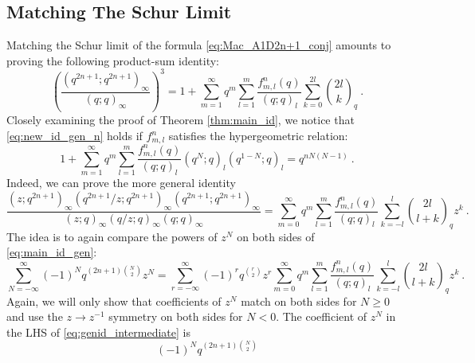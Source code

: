 \documentclass[a4paper,10pt]{article}
\newcommand{\tsf}[1]{\textsf{#1}}
\begin{document}
\subsection{Matching The Schur Limit}\label{sec:schur_gen_n}
Matching the Schur limit of the formula \eqref{eq:Mac_A1D2n+1_conj} amounts to proving the following product-sum identity:
\begin{equation}\label{eq:new_id_gen_n}
   \left(\frac{\left(q^{2n+1} ; q^{2n+1}\right)_{\infty}}{(q ; q)_{\infty}}\right)^3= 1 + \sum_{m=1}^\infty 
    q^m \sum_{l=1}^m
    \frac{f^n_{m,l}(q)}{(q;q)_l}\sum_{k=0}^{2l}\binom{2l}{k}_q~.
\end{equation}
Closely examining the proof of Theorem \ref{thm:main_id}, we notice that \eqref{eq:new_id_gen_n} holds if
$f^n_{m,l}$ satisfies the hypergeometric relation:
\begin{equation}\label{eq:fmnl_def}
    1 + \sum_{m=1}^\infty q^m \sum_{l=1}^m 
    \frac{f^n_{m,l}(q)}{(q;q)_l} (q^N; q)_l 
    (q^{1-N};q)_l = q^{nN(N-1)}~.
\end{equation}
Indeed, we can prove the more general identity 
\begin{equation}\label{eq:main_id_gen}
\frac{\left(z ; q^{2n+1}\right)_{\infty}\left(q^{2n+1} / z ; q^{2n+1}\right)_{\infty}\left(q^{2n+1} ; q^{2n+1}\right)_{\infty}}{(z ; q)_{\infty}(q / z ; q)_{\infty}(q ; q)_{\infty}}=\sum_{m=0}^{\infty}q^m\sum_{l=1}^m \frac{f^n_{m,l}(q)}{(q ; q)_l} \sum_{k=-l}^l{
2 l \choose
l+k}_q z^k~.    
\end{equation}
The idea is to again compare the powers of $z^N$ on both sides of \eqref{eq:main_id_gen}:
\begin{equation}\label{eq:genid_intermediate}
\sum_{N=-\infty}^{\infty}(-1)^N q^{(2n+1)\binom{N}{2}} z^N=\sum_{r=-\infty}^{\infty}(-1)^r q^{\binom{r}{2}} z^r \sum_{m=0}^{\infty}q^m \sum_{l=1}^m \frac{f^n_{m,l}(q)}{(q ; q)_l} \sum_{k=-l}^l{
2 l \choose
l+k}_q z^k~.     
\end{equation}
Again, we will only show that coefficients of $z^N$ match on both sides for $N\geq 0$ and use the $z\to z^{-1}$ symmetry on both sides for $N<0$. The coefficient of $z^N$ in the \tsf{LHS} of \eqref{eq:genid_intermediate} is 
\begin{equation}
    (-1)^Nq^{(2n+1){N\choose 2}}
\end{equation}
\end{document}
